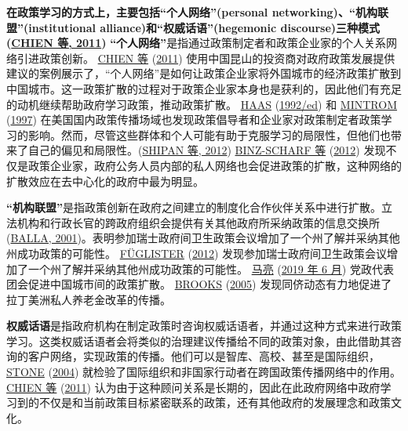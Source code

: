\documentclass[
  12pt,
]{ctexart}
\begin{document}
\textbf{在政策学习的方式上，主要包括``个人网络''(personal networking)、``机构联盟''(institutional alliance)和``权威话语''(hegemonic discourse)三种模式(\protect\hyperlink{ref-CHIENHo2011}{CHIEN 等, 2011})}
\textbf{``个人网络''}是指通过政策制定者和政策企业家的个人关系网络引进政策创新。
\protect\hyperlink{ref-CHIENHo2011}{CHIEN 等} (\protect\hyperlink{ref-CHIENHo2011}{2011}) 使用中国昆山的投资商对政府政策发展提供建议的案例展示了，``个人网络''是如何让政策企业家将外国城市的经济政策扩散到中国城市。这一政策扩散的过程对于政策企业家本身也是获利的，因此他们有充足的动机继续帮助政府学习政策，推动政策扩散。
\protect\hyperlink{ref-Haas1992}{HAAS} (\protect\hyperlink{ref-Haas1992}{1992/ed}) 和 \protect\hyperlink{ref-Mintrom1997}{MINTROM} (\protect\hyperlink{ref-Mintrom1997}{1997}) 在美国国内政策传播场域也发现政策倡导者和企业家对政策制定者政策学习的影响。然而，尽管这些群体和个人可能有助于克服学习的局限性，但他们也带来了自己的偏见和局限性。(\protect\hyperlink{ref-ShipanVolden2012}{SHIPAN 等, 2012})
\protect\hyperlink{ref-Binz-ScharfEtAl2012}{BINZ-SCHARF 等} (\protect\hyperlink{ref-Binz-ScharfEtAl2012}{2012}) 发现不仅是政策企业家，政府公务人员内部的私人网络也会促进政策的扩散，这种网络的扩散效应在去中心化的政府中最为明显。

\textbf{``机构联盟''}是指政策创新在政府之间建立的制度化合作伙伴关系中进行扩散。立法机构和行政长官的跨政府组织会提供有关其他政府所采纳政策的信息交换所(\protect\hyperlink{ref-Balla2001}{BALLA, 2001})。表明参加瑞士政府间卫生政策会议增加了一个州了解并采纳其他州成功政策的可能性。 \protect\hyperlink{ref-Fuglister2012}{FÜGLISTER} (\protect\hyperlink{ref-Fuglister2012}{2012}) 发现参加瑞士政府间卫生政策会议增加了一个州了解并采纳其他州成功政策的可能性。 \protect\hyperlink{ref-MaLiang2019}{马亮} (\protect\hyperlink{ref-MaLiang2019}{2019 年 6 月}) 党政代表团会促进中国城市间的政策扩散。 \protect\hyperlink{ref-Brooks2005}{BROOKS} (\protect\hyperlink{ref-Brooks2005}{2005}) 发现同侪动态有力地促进了拉丁美洲私人养老金改革的传播。

\textbf{权威话语}是指政府机构在制定政策时咨询权威话语者，并通过这种方式来进行政策学习。这类权威话语者会将类似的治理建议传播给不同的政策对象，由此借助其咨询的客户网络，实现政策的传播。他们可以是智库、高校、甚至是国际组织，\protect\hyperlink{ref-Stone2004}{STONE} (\protect\hyperlink{ref-Stone2004}{2004}) 就检验了国际组织和非国家行动者在跨国政策传播网络中的作用。\protect\hyperlink{ref-CHIENHo2011}{CHIEN 等} (\protect\hyperlink{ref-CHIENHo2011}{2011}) 认为由于这种顾问关系是长期的，因此在此政府网络中政府学习到的不仅是和当前政策目标紧密联系的政策，还有其他政府的发展理念和政策文化。
\end{document}
